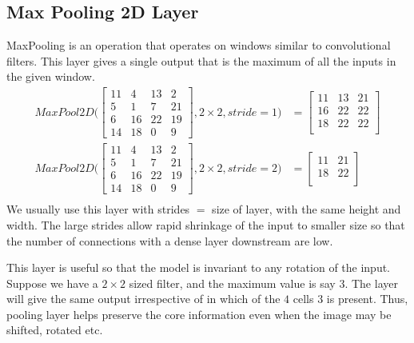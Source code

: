 \documentclass[../../deep_learning_notes.tex]{subfiles}
\begin{document}
\subsection{Max Pooling 2D Layer}
MaxPooling is an operation that operates on windows similar to convolutional filters. This layer gives a single output that is the maximum of all the inputs in the given window.
\begin{align*}
    MaxPool2D \bigg( \begin{bmatrix}
        11  &4 &13  &2\\
        5   &1  &7 &21\\
        6  &16 &22 &19\\
       14  &18  &0  &9
    \end{bmatrix}, 2 \times 2, stride = 1 \bigg) &=
    \begin{bmatrix}
        11  &13 &21\\
        16  &22 &22\\
        18  &22 &22\\
    \end{bmatrix}\\
    MaxPool2D \bigg( \begin{bmatrix}
        11  &4 &13  &2\\
        5   &1  &7 &21\\
        6  &16 &22 &19\\
       14  &18  &0  &9
    \end{bmatrix}, 2 \times 2, stride = 2 \bigg) &=
    \begin{bmatrix}
        11 &21\\
        18 &22\\
    \end{bmatrix}\\
\end{align*}
We usually use this layer with strides $=$ size of layer, with the same height and width. The large strides allow rapid shrinkage of the input to smaller size so that the number of connections with a dense layer downstream are low.\newline

This layer is useful so that the model is invariant to any rotation of the input. Suppose we have a $2 \times 2$ sized filter, and the maximum value is say $3$. The layer will give the same output irrespective of in which of the $4$ cells $3$ is present. Thus, pooling layer helps preserve the core information even when the image may be shifted, rotated etc.\newline
\end{document}
